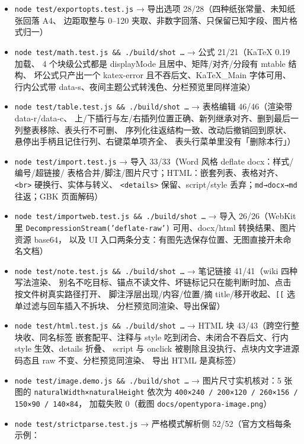 \documentclass[11pt,a4paper]{ctexart}
\begin{document}
\begin{itemize}
上半/下半的插入位置、拖完不误插一行、撤销恢复；严格模式开关后渲染差异
与源码逐字符不变、可来回切）
\item \texttt{node test/exportopts.test.js} → 导出选项 28/28（四种纸张常量、未知纸张回落 A4、
边距取整与 0–120 夹取、非数字回落、只保留已知字段、图片格式归一）
\item \texttt{node test/math.test.js \&\& ./build/shot …} → 公式 21/21（KaTeX 0.19 加载、
4 个块级公式都是 displayMode 且居中、矩阵/对齐/分段有 mtable 结构、
坏公式只产出一个 katex-error 且不吞后文、KaTeX\_Main 字体可用、
行内公式带 data-s、夜间主题公式转浅色、分栏预览里同样渲染）
\item \texttt{node test/table.test.js \&\& ./build/shot …} → 表格编辑 46/46（渲染带 data-r/data-c、
上/下插行与左/右插列位置正确、新列继承对齐、删到最后一列整表移除、表头行不可删、
序列化往返结构一致、改动后撤销回到原状、悬停出手柄且记住行列、右键菜单项齐全、
表头行菜单里没有「删除本行」）
\item \texttt{node test/import.test.js} → 导入 33/33（Word 风格 deflate docx：样式/编号/超链接/
表格合并/脚注/图片尺寸；HTML：嵌套列表、表格对齐、\texttt{\textless{}br\textgreater{}} 硬换行、实体与转义、
\texttt{\textless{}details\textgreater{}} 保留、script/style 丢弃；\texttt{md→docx→md} 往返；GBK 页面解码）
\item \texttt{node test/importweb.test.js \&\& ./build/shot …} → 导入 26/26（WebKit 里
\texttt{DecompressionStream('deflate-raw')} 可用、docx/html 转换结果、图片资源 base64，
以及 UI 入口两条分支：有图先选保存位置、无图直接开未命名文档）
\item \texttt{node test/note.test.js \&\& ./build/shot …} → 笔记链接 41/41（wiki 四种写法渲染、
别名不吃目标、锚点不读文件、坏链标记只在能判断时加、点击按文件树真实路径打开、
脚注浮层出现/内容/位置/摘 title/移开收起、\texttt{[[} 选单过滤与回车插入不拆块、
分栏预览同渲染、导出保留）
\item \texttt{node test/html.test.js \&\& ./build/shot …} → HTML 块 43/43（跨空行整块收、同名标签
嵌套配平、注释与 style 吃到闭合、未闭合不吞后文、行内 style 生效、details 折叠、
script 与 onclick 被剔除且没执行、点块内文字进源码态且 raw 不变、分栏预览同渲染、
导出 HTML 是真标签）
\item \texttt{node test/image.demo.js \&\& ./build/shot …} → 图片尺寸实机核对：5 张图的
\texttt{naturalWidth×naturalHeight} 依次为 \texttt{400×240 / 200×120 / 260×156 / 150×90 / 140×84}，
加载失败 0（截图 \texttt{docs/opentypora-image.png}）
\item \texttt{node test/strictparse.test.js} → 严格模式解析侧 52/52（官方文档每条示例：

\end{itemize}
\end{document}
